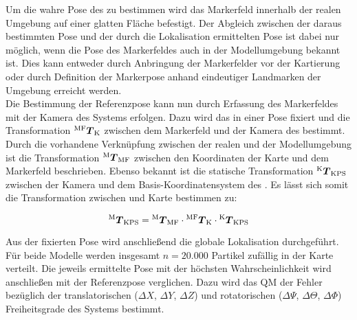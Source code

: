 
Um die wahre Pose des  zu bestimmen wird das Markerfeld innerhalb der realen Umgebung auf einer glatten Fläche befestigt. Der Abgleich zwischen der daraus bestimmten Pose und der durch die Lokalisation ermittelten Pose ist dabei nur möglich, wenn die Pose des Markerfeldes auch in der Modellumgebung bekannt ist. Dies kann entweder durch Anbringung der Markerfelder vor der Kartierung oder durch Definition der Markerpose anhand eindeutiger Landmarken der Umgebung erreicht werden.\\

Die Bestimmung der Referenzpose kann nun durch Erfassung des Markerfeldes mit der Kamera des Systems erfolgen. Dazu wird das \kps{} in einer Pose fixiert und die Transformation ${^{\mathrm{MF}}\mbox{\boldmath{$T$}}_{\mathrm{K}}}$ zwischen dem Markerfeld und der Kamera des  bestimmt. Durch die vorhandene Verknüpfung zwischen der realen und der Modellumgebung ist die Transformation ${^{\mathrm{M}}\mbox{\boldmath{$T$}}_{\mathrm{MF}}}$ zwischen den Koordinaten der Karte und dem Markerfeld beschrieben. Ebenso bekannt ist die statische Transformation ${^{\mathrm{K}}\mbox{\boldmath{$T$}}_{\mathrm{KPS}}}$ zwischen der Kamera und dem Basis-Koordinatensystem des . Es lässt sich somit die Transformation zwischen \kps{} und Karte bestimmen zu:

\prever{
}

\begin{equation}
{^{\mathrm{M}}\mbox{\boldmath{$T$}}_{\mathrm{KPS}}} = {^{\mathrm{M}}\mbox{\boldmath{$T$}}_{\mathrm{MF}}} \cdot {^{\mathrm{MF}}\mbox{\boldmath{$T$}}_{\mathrm{K}}} \cdot {^{\mathrm{K}}\mbox{\boldmath{$T$}}_{\mathrm{KPS}}}
\end{equation}

Aus der fixierten Pose wird anschließend die globale Lokalisation durchgeführt. Für beide Modelle werden insgesamt $n=20.000$ Partikel zufällig in der Karte verteilt. Die jeweils ermittelte Pose mit der höchsten Wahrscheinlichkeit wird anschließen mit der Referenzpose verglichen. Dazu wird das QM der Fehler bezüglich der translatorischen ($\Delta X$, $\Delta Y$, $\Delta Z$) und rotatorischen ($\Delta \Psi$, $\Delta \Theta$, $\Delta \Phi$) Freiheitsgrade des Systems bestimmt.\\


